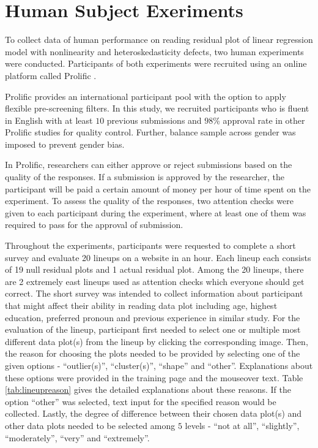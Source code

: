 \documentclass{monashthesis}
\begin{document}
\hypertarget{human-subject-exeriments}{%
\chapter{Human Subject Exeriments}\label{human-subject-exeriments}}

To collect data of human performance on reading residual plot of linear regression model with nonlinearity and heteroskedasticity defects, two human experiments were conducted. Participants of both experiments were recruited using an online platform called Prolific \autocite{prolific_prolific_2022}.

Prolific provides an international participant pool with the option to apply flexible pre-screening filters. In this study, we recruited participants who is fluent in English with at least \(10\) previous submissions and \(98\)\% approval rate in other Prolific studies for quality control. Further, balance sample across gender was imposed to prevent gender bias.

In Prolific, researchers can either approve or reject submissions based on the quality of the responses. If a submission is approved by the researcher, the participant will be paid a certain amount of money per hour of time spent on the experiment. To assess the quality of the responses, two attention checks were given to each participant during the experiment, where at least one of them was required to pass for the approval of submission.

Throughout the experiments, participants were requested to complete a short survey and evaluate 20 lineups on a website in an hour. Each lineup each consists of 19 null residual plots and 1 actual residual plot. Among the 20 lineups, there are 2 extremely east lineups used as attention checks which everyone should get correct. The short survey was intended to collect information about participant that might affect their ability in reading data plot including age, highest education, preferred pronoun and previous experience in similar study. For the evaluation of the lineup, participant first needed to select one or multiple most different data plot(s) from the lineup by clicking the corresponding image. Then, the reason for choosing the plots needed to be provided by selecting one of the given options - ``outlier(s)'', ``cluster(s)'', ``shape'' and ``other''. Explanations about these options were provided in the training page and the mouseover text. Table \ref{tab:lineupreason} gives the detailed explanations about these reasons. If the option ``other'' was selected, text input for the specified reason would be collected. Lastly, the degree of difference between their chosen data plot(s) and other data plots needed to be selected among \(5\) levels - ``not at all'', ``slightly'', ``moderately'', ``very'' and ``extremely''.
\end{document}
